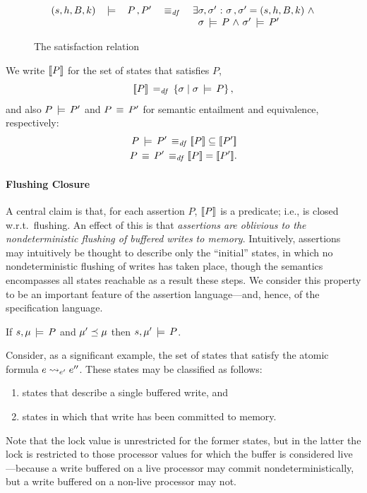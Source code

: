 \documentclass[11pt]{report}
\begin{document}
\begin{figure}[ht]
{\begin{minipage}{\columnwidth}
\[\begin{array}{llllll}
		(s,h,B,k) & \,\models\, & {P \operatorname{,} P'} & \operatorname{\;\equiv_{\mathit{df}}\;} & \exists \sigma,\sigma' \operatorname{\,:\,} \sigma \operatorname{,} \sigma' = (s,h,B,k) \operatorname{\,\wedge\,} \\ & & & & \;\;\sigma \,\models\,{P} \operatorname{\,\wedge\,} \sigma' \,\models\,{P'} \\
	\end{array}
	\]
\end{minipage}}
	\caption{\label{fig:satisfaction-relation} The satisfaction relation}
\end{figure}

We write $[\![P]\!]$ for the set of states that satisfies $P$,\[ [\![P]\!] \operatorname{\;=_{\mathit{df}}\;} \left\lbrace \sigma \mid \sigma \,\models\, P \right\rbrace,\] and also $P \,\models\, P'$ and $P \,\equiv\, P'$ for semantic entailment and equivalence, respectively: \begin{align*}
	P \sentails P' \iffdef \pred{P} \subseteq \pred{P'} \\
	P \sequiv P' \iffdef \pred{P} = \pred{P'}.
\end{align*} 

\paragraph{Flushing Closure}A central claim is that, for each assertion $P$, $[\![P]\!]$ is a predicate; i.e., is closed w.r.t.~flushing. An effect of this is that \emph{assertions are oblivious to the nondeterministic flushing of buffered writes to memory}. Intuitively, assertions may intuitively be thought to describe only the ``initial'' states, in which no nondeterministic flushing of writes has taken place, though the semantics encompasses all states reachable as a result these steps. We consider this property to be an important feature of the assertion language---and, hence, of the specification language. 

\begin{lemma}
	\label{lem:flushing-closure}
	If $s,\mu \,\models\, P$ and $\mu' \preceq \mu$ then $s,\mu' \,\models\, P$. 
\end{lemma}

Consider, as a significant example, the set of states that satisfy the atomic formula $e \leadsto_{e'} e''$. These states may be classified as follows: \begin{enumerate}
	\item states that describe a single buffered write, and 
	\item states in which that write has been committed to memory. 
\end{enumerate} Note that the lock value is unrestricted for the former states, but in the latter the lock is restricted to those processor values for which the buffer is considered live---because a write buffered on a live processor may commit nondeterministically, but a write buffered on a non-live processor may not. 
\end{document}
